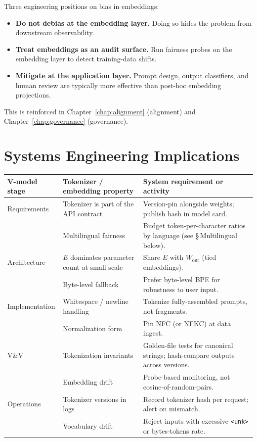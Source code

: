 Three engineering positions on bias in embeddings:
\begin{itemize}
  \item \textbf{Do not debias at the embedding layer.} Doing so hides
        the problem from downstream observability.
  \item \textbf{Treat embeddings as an audit surface.} Run fairness
        probes on the embedding layer to detect training-data shifts.
  \item \textbf{Mitigate at the application layer.} Prompt design,
        output classifiers, and human review are typically more
        effective than post-hoc embedding projections.
\end{itemize}
This is reinforced in Chapter~\ref{chap:alignment} (alignment) and Chapter~\ref{chap:governance} (governance).

\section{Systems Engineering Implications}

\begin{center}
\begin{tabular}{|p{3.4cm}|p{3.4cm}|p{6.8cm}|}
\hline
V-model stage & Tokenizer / embedding property & System requirement or activity \\
\hline
Requirements & Tokenizer is part of the API contract
             & Version-pin alongside weights; publish hash in model
               card. \\
 & Multilingual fairness & Budget token-per-character ratios by
   language (see \S\,Multilingual below). \\
\hline
Architecture & $E$ dominates parameter count at small scale
             & Share $E$ with $W_{\mathrm{out}}$ (tied embeddings). \\
 & Byte-level fallback & Prefer byte-level BPE for
   robustness to user input. \\
\hline
Implementation & Whitespace / newline handling
               & Tokenize fully-assembled prompts, not fragments. \\
 & Normalization form & Pin NFC (or NFKC) at data ingest. \\
\hline
V\&V & Tokenization invariants & Golden-file tests for canonical
   strings; hash-compare outputs across versions. \\
 & Embedding drift & Probe-based monitoring, not
   cosine-of-random-pairs. \\
\hline
Operations & Tokenizer versions in logs
           & Record tokenizer hash per request; alert on mismatch. \\
 & Vocabulary drift & Reject inputs with excessive
   \texttt{<unk>} or bytes-tokens rate. \\
\hline
\end{tabular}
\end{center}

